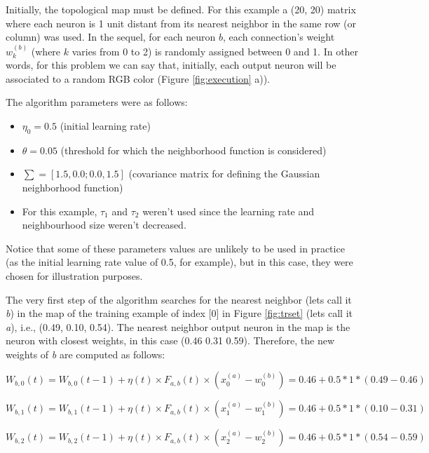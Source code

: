 Initially, the topological map must be defined. For this example a (20, 20) matrix where each neuron is 1 unit distant from its nearest neighbor in the same row (or column) was used. In the sequel, for each neuron $b$, each connection's weight $w_{k}^{(b)}$ (where $k$ varies from 0 to 2) is randomly assigned between 0 and 1. In other words, for this problem we can say that, initially, each output neuron will be associated to a random RGB color (Figure \ref{fig:execution} a)).

The algorithm parameters were as follows:
\begin{itemize}
    \item $\eta_{0} = 0.5$ (initial learning rate)
    \item $\theta = 0.05$ (threshold for which the neighborhood function is considered)
    \item $\sum = [1.5, 0.0; 0.0, 1.5]$ (covariance matrix for defining the Gaussian neighborhood function)
    \item For this example, $\tau_{1}$ and $\tau_2$ weren't used since the learning rate and neighbourhood size weren't decreased. 
\end{itemize}

Notice that some of these parameters values are unlikely to be used in practice (as the initial learning rate value of 0.5, for example), but in this case, they were chosen for illustration purposes.

The very first step of the algorithm searches for the nearest neighbor (lets call it \textit{b}) in the map of the training example of index [0] in Figure \ref{fig:trset} (lets call it \textit{a}), i.e., (0.49, 0.10, 0.54). The nearest neighbor output neuron in the map is the neuron with closest weights, in this case (0.46 0.31 0.59). Therefore, the new weights of \textit{b} are computed as follows:

\vspace{0.2cm}

\noindent $W_{b,0}(t) = W_{b,0}(t-1) +  \eta(t) \times F_{a,b}(t) \times (x_{0}^{(a)} - w_{0}^{(b)}) = 0.46 + 0.5 * 1 * (0.49 - 0.46)$

\vspace{0.2cm}

\noindent $W_{b,1}(t) = W_{b,1}(t-1) +  \eta(t) \times F_{a,b}(t) \times (x_{1}^{(a)} - w_{1}^{(b)}) = 0.46 + 0.5 * 1 * (0.10 - 0.31)$

\vspace{0.2cm}

\noindent $W_{b,2}(t) = W_{b,2}(t-1) +  \eta(t) \times F_{a,b}(t) \times (x_{2}^{(a)} - w_{2}^{(b)}) = 0.46 + 0.5 * 1 * (0.54 - 0.59)$

